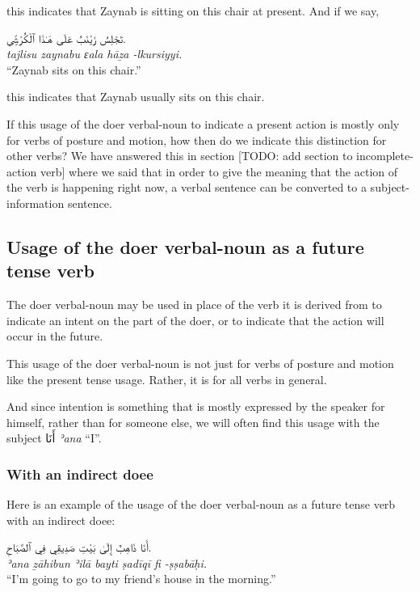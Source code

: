 \documentclass[
  10pt,
]{book}
\begin{document}
this indicates that Zaynab is sitting on this chair at present. And if we say,

\foreignlanguage{arabic}{تَجْلِسُ زَيْنَبُ عَلَى هَـٰذَا ٱلْکُرْسِيِّ.}\\
\emph{tajlisu zaynabu ɛala hāẕa -lkursiyyi.}\\
\enquote{Zaynab sits on this chair.}

this indicates that Zaynab usually sits on this chair.

If this usage of the doer verbal-noun to indicate a present action is mostly only for verbs of posture and motion, how then do we indicate this distinction for other verbs? We have answered this in section {[}TODO: add section to incomplete-action verb{]} where we said that in order to give the meaning that the action of the verb is happening right now, a verbal sentence can be converted to a subject-information sentence.

\subsection{Usage of the doer verbal-noun as a future tense verb}\label{usage-of-the-doer-verbal-noun-as-a-future-tense-verb}

The doer verbal-noun may be used in place of the verb it is derived from to indicate an intent on the part of the doer, or to indicate that the action will occur in the future.

This usage of the doer verbal-noun is not just for verbs of posture and motion like the present tense usage. Rather, it is for all verbs in general.

And since intention is something that is mostly expressed by the speaker for himself, rather than for someone else, we will often find this usage with the subject \foreignlanguage{arabic}{أَنَا} \emph{ʾana} \enquote{I}.

\subsubsection{With an indirect doee}\label{with-an-indirect-doee-1}

Here is an example of the usage of the doer verbal-noun as a future tense verb with an indirect doee:

\foreignlanguage{arabic}{أَنَا ذَاهِبٌ إِلَىٰ بَيْتِ صَدِيقِي فِي ٱلصَّبَاحِ.}\\
\emph{ʾana ẕāhibun ʾilā bayti ṣadīqī fi -ṣṣabāḥi.}\\
\enquote{I'm going to go to my friend's house in the morning.}
\end{document}
